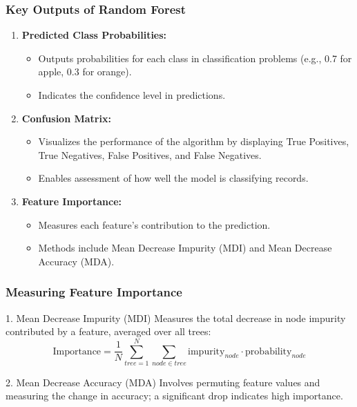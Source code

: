\documentclass[aspectratio=169]{beamer}
\begin{document}
\begin{frame}
    \frametitle{Key Outputs of Random Forest}
    \begin{enumerate}
        \item \textbf{Predicted Class Probabilities:}
            \begin{itemize}
                \item Outputs probabilities for each class in classification problems (e.g., 0.7 for apple, 0.3 for orange).
                \item Indicates the confidence level in predictions.
            \end{itemize}
        
        \item \textbf{Confusion Matrix:}
            \begin{itemize}
                \item Visualizes the performance of the algorithm by displaying True Positives, True Negatives, False Positives, and False Negatives.
                \item Enables assessment of how well the model is classifying records.
            \end{itemize}
        
        \item \textbf{Feature Importance:}
            \begin{itemize}
                \item Measures each feature's contribution to the prediction.
                \item Methods include Mean Decrease Impurity (MDI) and Mean Decrease Accuracy (MDA).
            \end{itemize}
    \end{enumerate}
\end{frame}

\begin{frame}
    \frametitle{Measuring Feature Importance}
    \begin{block}{1. Mean Decrease Impurity (MDI)}
        Measures the total decrease in node impurity contributed by a feature, averaged over all trees:
        \begin{equation}
            \text{Importance} = \frac{1}{N} \sum_{tree=1}^{N} \sum_{node \in tree}\text{impurity}_{node} \cdot \text{probability}_{node}
        \end{equation}
    \end{block}

    \begin{block}{2. Mean Decrease Accuracy (MDA)}
        Involves permuting feature values and measuring the change in accuracy; a significant drop indicates high importance.
    \end{block}
\end{frame}
\end{document}
